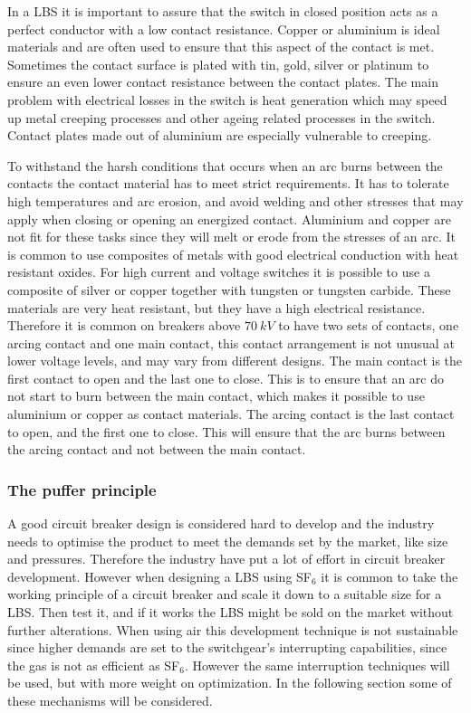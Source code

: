 \documentclass[10pt,a4paper]{article}
\begin{document}
In a LBS it is important to assure that the switch in closed position acts as a perfect conductor with a low contact resistance. Copper or aluminium is ideal materials and are often used to ensure that this aspect of the contact is met. Sometimes the contact surface is plated with tin, gold, silver or platinum to ensure an even lower contact resistance between the contact plates. The main problem with electrical losses in the switch is heat generation which may speed up metal creeping processes and other ageing related processes in the switch. Contact plates made out of aluminium are especially vulnerable to creeping.
 
To withstand the harsh conditions that occurs when an arc burns between the contacts the contact material has to meet strict requirements. It has to tolerate high temperatures and arc erosion, and avoid welding and other stresses that may apply when closing or opening an energized contact. Aluminium and copper are not fit for these tasks since they will melt or erode from the stresses of an arc. It is common to use composites of metals with good electrical conduction with heat resistant oxides. For high current and voltage switches it is possible to use a composite of silver or copper together with tungsten or tungsten carbide. These materials are very heat resistant, but they have a high electrical resistance. Therefore it is common on breakers above $70 \ kV$ to have two sets of contacts, one arcing contact and one main contact, this contact arrangement is not unusual at lower voltage levels, and may vary from different designs. The main contact is the first contact to open and the last one to close. This is to ensure that an arc do not start to burn between the main contact, which makes it possible to use aluminium or copper as contact materials. The arcing contact is the last contact to open, and the first one to close. This will ensure that the arc burns between the arcing contact and not between the main contact.

\subsubsection{The puffer principle}
A good circuit breaker design is considered hard to develop and the industry needs to optimise the product to meet the demands set by the market, like size and pressures. Therefore the industry have put a lot of effort in circuit breaker development. However when designing a LBS using SF$_6$ it is common to take the working principle of a circuit breaker and scale it down to a suitable size for a LBS. Then test it, and if it works the LBS might be sold on the market without further alterations. When using air this development technique is not sustainable since higher demands are set to the switchgear's interrupting capabilities, since the gas is not as efficient as SF$_6$. However the same interruption techniques will be used, but with more weight on optimization. In the following section some of these mechanisms will be considered. 
\end{document}
